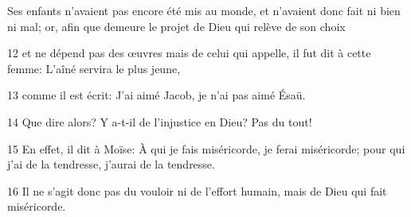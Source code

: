  Ses enfants n’avaient pas encore été mis au monde, et n’avaient donc fait ni bien ni mal; or, afin que demeure le projet de Dieu qui relève de son choix

12 et ne dépend pas des œuvres mais de celui qui appelle, il fut dit à cette femme: L’aîné servira le plus jeune,

13 comme il est écrit: J’ai aimé Jacob, je n’ai pas aimé Ésaü.

14 Que dire alors? Y a-t-il de l’injustice en Dieu? Pas du tout!

15 En effet, il dit à Moïse: À qui je fais miséricorde, je ferai miséricorde; pour qui j’ai de la tendresse, j’aurai de la tendresse.

16 Il ne s’agit donc pas du vouloir ni de l’effort humain, mais de Dieu qui fait miséricorde.
